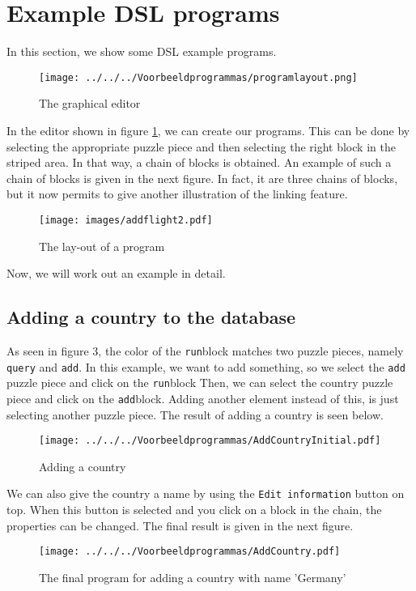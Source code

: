 
\section{Example DSL programs}
In this section, we show some DSL example programs. %

\begin{figure}[H]
	\centering
	\texttt{[image: ../../../Voorbeeldprogrammas/programlayout.png]}
	\caption{The graphical editor}
	\label{ex:DSLlayout}
\end{figure}
\noindent In the editor shown in figure \ref{ex:DSLlayout}, we can create our programs. This can be done by selecting the appropriate puzzle piece and then selecting the right block in the striped area. In that way, a chain of blocks is obtained. An example of such a chain of blocks is given in the next figure. In fact, it are three chains of blocks, but it now permits to give another illustration of the linking feature.
\begin{figure}[H]
	\centering
	\texttt{[image: images/addflight2.pdf]}
	\caption{The lay-out of a program}
	\label{ex:generalexample}
\end{figure}
Now, we will work out an example in detail.

\subsection{Adding a country to the database}
As seen in figure 3, the color of the \texttt{run}block matches two puzzle pieces, namely \texttt{query} and \texttt{add}.
In this example, we want to add something, so we select the \texttt{add} puzzle piece and click on the \texttt{run}block Then, we can select the country puzzle piece and click on the \texttt{add}block. Adding another element instead of this, is just selecting another puzzle piece. The result of adding a country is seen below.
\begin{figure}[H]
	\centering
	\texttt{[image: ../../../Voorbeeldprogrammas/AddCountryInitial.pdf]}
	\caption{Adding a country}
	\label{ex:addCountryInitial}
\end{figure}
\noindent We can also give the country a name by using the \texttt{Edit information} button on top. When this button is selected and you click on a block in the chain, the properties can be changed. The final result is given in the next figure.
\begin{figure}[H]
	\centering
	\texttt{[image: ../../../Voorbeeldprogrammas/AddCountry.pdf]}
	\caption{The final program for adding a country with name 'Germany'}
	\label{ex:addCountry}
\end{figure}

